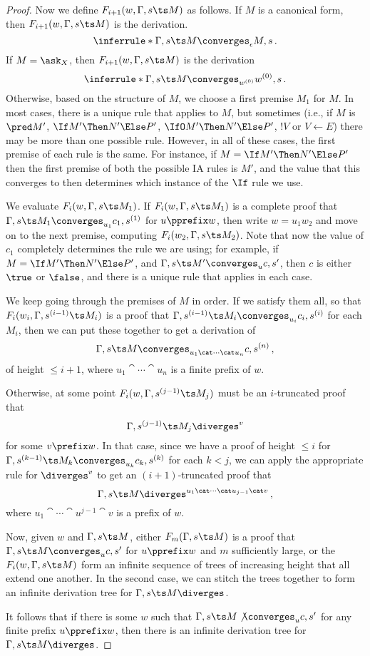 \begin{proof}
  Now we define $F_{i+1}(w,\Gamma,s\ts M)$ as follows.  
  If $M$ is a canonical form, then $F_{i+1}(w,\Gamma,s\ts M)$ is the derivation.
  \[
    \inferrule*{ }{\Gamma,s\ts M\converges_\epsilon M,s}\,.
    \]
  If $M=\ask_X$, then $F_{i+1}(w,\Gamma,s\ts M)$ is the derivation
  \[
    \inferrule*{ }{\Gamma,s\ts M\converges_{w^{(0)}} w^{(0)},s}\,.
    \]
  Otherwise, based on the structure of $M$, we choose a first premise $M_1$ for $M$.  
  In most cases, there is a unique \IAX rule that applies to $M$, but sometimes (i.e., if $M$ is $\pred M'$, $\If M' \Then N' \Else P'$, $\IfO M' \Then N' \Else P'$, $!V$ or $V\gets E$) there may be more than one possible rule.  
  However, in all of these cases, the first premise of each rule is the same.  
  For instance, if $M=\If M' \Then N' \Else P'$ then the first premise of both the possible IA rules is $M'$, and the value that this converges to then determines which instance of the $\If$ rule we use.

  We evaluate $F_i(w,\Gamma,s\ts M_1)$.  
  If $F_i(w,\Gamma,s\ts M_1)$ is a complete proof that $\Gamma,s\ts M_1 \converges_{u_1} c_1,s^{(1)}$ for $u\pprefix w$, then write $w=u_1w_2$ and move on to the next premise, computing $F_i(w_2,\Gamma,s\ts M_2)$.  
  Note that now the value of $c_1$ completely determines the \IAX rule we are using; for example, if $M=\If M' \Then N' \Else P'$, and $\Gamma,s\ts M' \converges_{u} c,s'$, then $c$ is either $\true$ or $\false$, and there is a unique \IAX rule that applies in each case.

  We keep going through the premises of $M$ in order.  
  If we satisfy them all, so that $F_i(w_i,\Gamma,s^{(i-1)} \ts M_i)$ is a proof that $\Gamma,s^{(i-1)} \ts M_i \converges_{u_i} c_i,s^{(i)}$ for each $M_i$, then we can put these together to get a derivation of
  \[
    \Gamma,s \ts M\converges_{u_1\cat \cdots \cat u_n} c,s^{(n)}\,,
    \]
  of height $\le i+1$, where $u_1\cat \cdots \cat u_n$ is a finite prefix of $w$.
  
  Otherwise, at some point $F_i(w,\Gamma,s^{(j-1)}\ts M_j)$ must be an $i$-truncated proof that
  \[
    \Gamma,s^{(j-1)}\ts M_j\diverges^v
    \]
  for some $v\prefix w$.
  In that case, since we have a proof of height $\le i$ for $\Gamma,s^{(k-1)}\ts M_k \converges_{u_k} c_k,s^{(k)}$ for each $k<j$, we can apply the appropriate rule for $\diverges^v$ to get an $(i+1)$-truncated proof that
  \[
    \Gamma,s\ts M\diverges^{u_1\cat \cdots \cat u_{j-1} \cat v}\,,
    \]
  where $u_1\cat \cdots \cat u^{j-1} \cat v$ is a prefix of $w$.

  Now, given $w$ and $\Gamma,s\ts M$, either $F_m(\Gamma,s\ts M)$ is a proof that $\Gamma,s\ts M\converges_u c,s'$ for $u\pprefix w$ and $m$ sufficiently large, or the $F_i(w,\Gamma,s\ts M)$ form an infinite sequence of trees of increasing height that all extend one another.  
  In the second case, we can stitch the trees together to form an infinite derivation tree for $\Gamma,s\ts M\diverges$.

  It follows that if there is some $w$ such that $\Gamma,s\ts M\not\converges_u c,s'$ for any finite prefix $u\pprefix w$, then there is an infinite derivation tree for $\Gamma,s\ts M\diverges$.
\end{proof}

